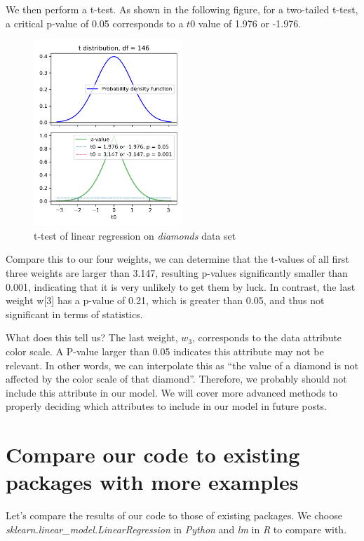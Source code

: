 \documentclass[
	letterpaper
]{article}
\begin{document}
We then perform a t-test.
As shown in the following figure, for a two-tailed t-test, a critical p-value of 0.05 corresponds to a $t0$ value of 1.976 or -1.976.
\begin{figure}[htbp]
	\centering
	\includegraphics[width=0.5\textwidth]{figures/t-test.png}
	\caption{t-test of linear regression on \textit{diamonds} data set}
	\label{fig:t-test}
\end{figure}

Compare this to our four weights, we can determine that the t-values of all first three weights are larger than 3.147, resulting p-values significantly smaller than 0.001, indicating that it is very unlikely to get them by luck. In contrast, the last weight w[3] has a p-value of 0.21, which is greater than 0.05, and thus not significant in terms of statistics.

What does this tell us?
The last weight, $w_3$, corresponds to the data attribute color scale. 
A P-value larger than 0.05 indicates this attribute may not be relevant. 
In other words, we can interpolate this as ``the value of a diamond is not affected by the color scale of that diamond''.
Therefore, we probably should not include this attribute in our model.
We will cover more advanced methods to properly deciding which attributes to include in our model in future posts. 

\section{Compare our code to existing packages with more examples}
Let's compare the results of our code to those of existing packages.
We choose \textit{sklearn.linear\_model.LinearRegression} in \textit{Python} and \textit{lm} in \textit{R} to compare with.
\end{document}
